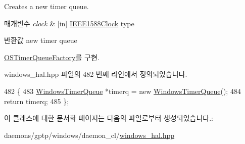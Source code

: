 Creates a new timer queue. 


\begin{DoxyParams}{매개변수}
{\em clock} & \mbox{[}in\mbox{]} \hyperlink{class_i_e_e_e1588_clock}{I\+E\+E\+E1588\+Clock} type \\
\hline
\end{DoxyParams}
\begin{DoxyReturn}{반환값}
new timer queue 
\end{DoxyReturn}


\hyperlink{class_o_s_timer_queue_factory_a6ef36ae2e4e33a6683ee412f06af7a85}{O\+S\+Timer\+Queue\+Factory}를 구현.



windows\+\_\+hal.\+hpp 파일의 482 번째 라인에서 정의되었습니다.


\begin{DoxyCode}
482                                                                      \{
483         \hyperlink{class_windows_timer_queue}{WindowsTimerQueue} *timerq = \textcolor{keyword}{new} \hyperlink{class_windows_timer_queue}{WindowsTimerQueue}();
484         \textcolor{keywordflow}{return} timerq;
485     \};
\end{DoxyCode}


이 클래스에 대한 문서화 페이지는 다음의 파일로부터 생성되었습니다.\+:\begin{DoxyCompactItemize}
\item 
daemons/gptp/windows/daemon\+\_\+cl/\hyperlink{windows__hal_8hpp}{windows\+\_\+hal.\+hpp}\end{DoxyCompactItemize}
